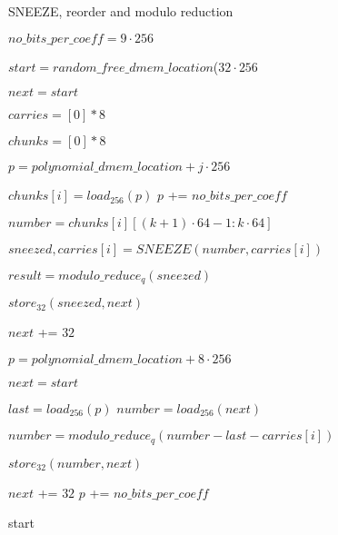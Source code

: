 \begin{algorithm}[h]
  \caption{SNEEZE, reorder and modulo reduction}
  \label{alg:step7}
  \begin{algorithmic}[1]


      \State $no\_bits\_per\_coeff = 9 \cdot 256$

      \State $start = random\_free\_dmem\_location$($32 \cdot 256$

      \State $next = start$

      \State $carries = [0] * 8$


        \State $chunks = [0] * 8$

        \State $p = polynomial\_dmem\_location + j \cdot 256$

          \State $chunks[i] = load_{256}(p)$
          \State $p$ += $no\_bits\_per\_coeff$
        \EndFor



            \State $number = chunks[i][(k + 1) \cdot 64 - 1 : k \cdot 64]$

            \State $sneezed, carries[i] = SNEEZE(number, carries[i])$

            \State $result = modulo\_reduce_q(sneezed)$

            \State $store_{32}(sneezed, next)$

            \State $next$ += $32$

          \EndFor

        \EndFor

      \EndFor

      \State $p = polynomial\_dmem\_location + 8 \cdot 256$ 

      \State $next = start$

        \State $last = load_{256}(p)$
        \State $number = load_{256}(next)$

        \State $number = modulo\_reduce_q(number - last - carries[i])$

        \State $store_{32}(number, next)$

        \State $next$ += $32$
        \State $p$ += $no\_bits\_per\_coeff$

      \EndFor

      \Return start

  \EndProcedure

  \end{algorithmic}
\end{algorithm}